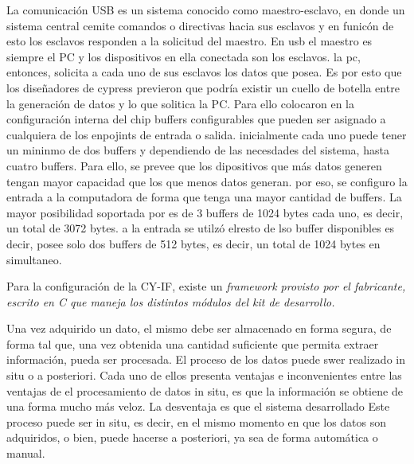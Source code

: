 	La comunicación USB es un sistema conocido como maestro-esclavo, en donde un sistema central cemite comandos o directivas hacia sus esclavos y en funicón de esto los esclavos responden
a la solicitud del maestro. En usb el maestro es siempre el PC y los dispositivos en ella conectada son los esclavos. la pc, entonces, solicita a cada uno de sus esclavos los datos que posea.
Es por esto que los diseñadores de cypress previeron que podría existir un cuello de botella entre la generación de datos y lo que solitica la PC. Para ello colocaron en la configuración interna
del chip buffers configurables que pueden ser asignado a cualquiera de los enpojints de entrada o salida.
inicialmente cada uno puede tener un mininmo de dos buffers y dependiendo de las necesdades del sistema, hasta cuatro buffers.
	Para ello, se prevee que los dipositivos que más datos generen tengan mayor capacidad que los que menos datos generan. por eso, se configuro la entrada a la computadora de forma que tenga
una mayor cantidad de buffers. La mayor posibilidad soportada por es de 3 buffers de 1024 bytes cada uno, es decir, un total de 3072 bytes. a la entrada se utilzó elresto de lso buffer disponibles
es decir, posee solo dos buffers de 512 bytes, es decir, un total de 1024 bytes en simultaneo.
	
	Para la configuración de la CY-IF, existe un \it{framework} provisto por el fabricante, escrito en C que maneja los distintos módulos del kit de desarrollo.





 
	Una vez adquirido un dato, el mismo debe ser almacenado en forma segura, de forma tal que, una vez obtenida una cantidad suficiente que permita extraer información, pueda ser procesada.
	El proceso de los datos puede swer realizado in situ o a posteriori.
	Cada uno de ellos presenta ventajas e inconvenientes
	entre las ventajas de el procesamiento de datos in situ, es que la información se obtiene de una forma mucho más veloz. La desventaja es que el sistema desarrollado 
Este proceso puede ser in situ, es decir, en el mismo
momento en que los datos son adquiridos, o bien, puede hacerse a posteriori, ya sea de forma automática o manual. 

